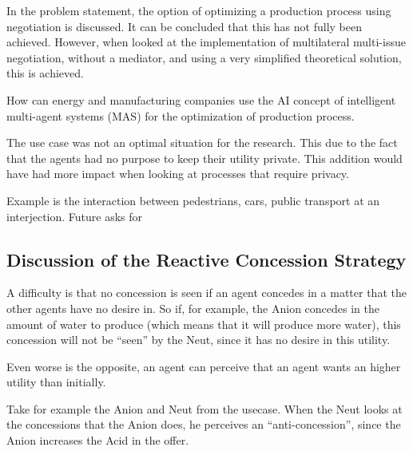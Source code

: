 In the problem statement, the option of optimizing a production process using negotiation is discussed. It can be concluded that this has not fully been achieved. However, when looked at the implementation of multilateral multi-issue negotiation, without a mediator, and using a very simplified theoretical solution, this is achieved. 


How can energy and manufacturing companies use the AI concept of intelligent multi-agent systems (MAS) for the optimization of production process.

The use case was not an optimal situation for the research. This due to the fact that the agents had no purpose to keep their utility private. This addition would have had more impact when looking at processes that require privacy.

Example is the interaction between pedestrians, cars, public transport at an interjection. Future asks for 


\subsection{Discussion of the Reactive Concession Strategy}

A difficulty is that no concession is seen if an agent concedes in a matter that the other agents have no desire in. So if, for example, the Anion concedes in the amount of water to produce (which means that it will produce more water), this concession will not be ``seen'' by the Neut, since it has no desire in this utility. 

Even worse is the opposite, an agent can perceive that an agent wants an higher utility than initially. %



Take for example the Anion and Neut from the usecase. When the Neut looks at the concessions that the Anion does, he perceives an ``anti-concession'', since the Anion increases the Acid in the offer. 

